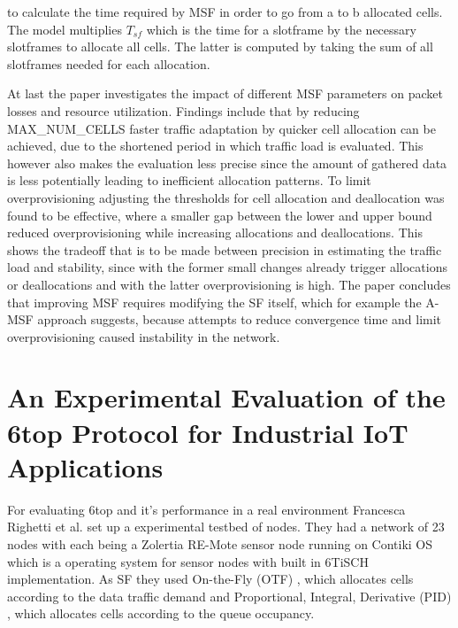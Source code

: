 \documentclass{comnets-thesis}
\begin{document}
to calculate the time required by \ac{MSF} in order to go from a to b allocated cells. The model multiplies $T_{sf}$ which is the time for a slotframe by the necessary slotframes to allocate all cells. The latter is computed by taking the sum of all slotframes needed for each allocation.

At last the paper investigates the impact of different \ac{MSF} parameters on packet losses and resource utilization. Findings include that by reducing MAX\_NUM\_CELLS faster traffic adaptation by quicker cell allocation can be achieved, due to the shortened period in which traffic load is evaluated. This however also makes the evaluation less precise since the amount of gathered data is less potentially leading to inefficient allocation patterns.
To limit overprovisioning adjusting the thresholds for cell allocation and deallocation was found to be effective, where a smaller gap between the lower and upper bound reduced overprovisioning while increasing allocations and deallocations. This shows the tradeoff that is to be made between precision in estimating the traffic load and stability, since with the former small changes already trigger allocations or deallocations and with the latter overprovisioning is high.
The paper concludes that improving \ac{MSF} requires modifying the \ac{SF} itself, which for example the A-MSF approach suggests, because attempts to reduce convergence time and limit overprovisioning caused instability in the network.


\section{An Experimental Evaluation of the 6top Protocol for Industrial IoT Applications}
For evaluating 6top and it's performance in a real environment \cite{ExperimentalEvaluationOf6topForIoT} Francesca Righetti et al. set up a experimental testbed of nodes. They had a network of 23 nodes with each being a Zolertia RE-Mote sensor node running on Contiki OS which is a operating system for sensor nodes with built in 6TiSCH implementation. As SF they used On-the-Fly (OTF) \cite{OTFFor6TiSCH}, which allocates cells according to the data traffic demand and Proportional, Integral, Derivative (PID) \cite{PIDBasedScheduling}, which allocates cells according to the queue occupancy.
\end{document}
